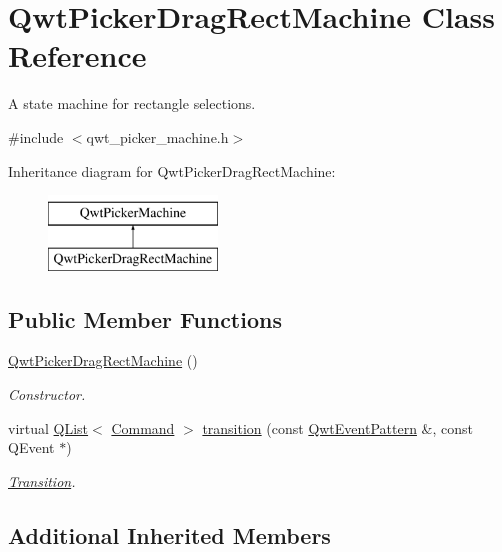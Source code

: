 \hypertarget{class_qwt_picker_drag_rect_machine}{\section{Qwt\-Picker\-Drag\-Rect\-Machine Class Reference}
\label{class_qwt_picker_drag_rect_machine}
}


A state machine for rectangle selections.  




{\ttfamily \#include $<$qwt\-\_\-picker\-\_\-machine.\-h$>$}

Inheritance diagram for Qwt\-Picker\-Drag\-Rect\-Machine\-:\begin{figure}[H]
\begin{center}
\leavevmode
\includegraphics[height=2.000000cm]{class_qwt_picker_drag_rect_machine}
\end{center}
\end{figure}
\subsection*{Public Member Functions}
\begin{DoxyCompactItemize}
\item 
\hyperlink{class_qwt_picker_drag_rect_machine_a49ce41d12442bc295578c0682cb38682}{Qwt\-Picker\-Drag\-Rect\-Machine} ()
\begin{DoxyCompactList}\small\item\em Constructor. \end{DoxyCompactList}\item 
virtual \hyperlink{class_q_list}{Q\-List}$<$ \hyperlink{class_qwt_picker_machine_a3a8d3d4c107ce5f8351e4cbdd38c43f7}{Command} $>$ \hyperlink{class_qwt_picker_drag_rect_machine_a5ff67c2ab51575ddbffe225288ff5f33}{transition} (const \hyperlink{class_qwt_event_pattern}{Qwt\-Event\-Pattern} \&, const Q\-Event $\ast$)
\begin{DoxyCompactList}\small\item\em \hyperlink{class_transition}{Transition}. \end{DoxyCompactList}\end{DoxyCompactItemize}
\subsection*{Additional Inherited Members}


